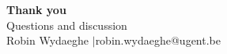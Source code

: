 \begin{frame}[plain]
  \vfill
  \begin{center}
    {\Large\color{navyblue}\bfseries Thank you}\\[12pt]
    {\normalsize Questions and discussion}\\[16pt]
    {\footnotesize Robin Wydaeghe \quad$\mid$\quad robin.wydaeghe@ugent.be}
  \end{center}
  \vfill
\end{frame}
